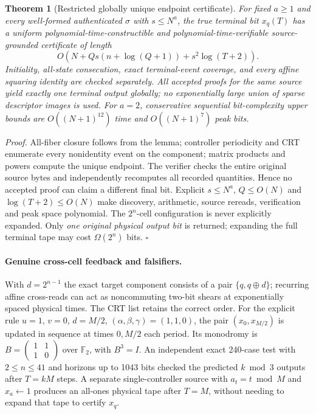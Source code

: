 \documentclass[11pt]{article}
\newtheorem{theorem}{Theorem}
\begin{document}
\begin{theorem}[Restricted globally unique endpoint certificate]
For fixed $a\ge1$ and every well-formed authenticated $\sigma$
with $s\le N^a$, the true terminal bit $x_q(T)$ has a
uniform polynomial-time-constructible and polynomial-time-verifiable
source-grounded certificate of length
\[
O\!\left(N+Qs(n+\log(Q+1))+s^2\log(T+2)\right).
\]
Initiality, all-state consecution, exact terminal-event coverage,
and every affine squaring identity are checked separately.
All accepted proofs for the same source yield \emph{exactly one}
terminal output globally; no exponentially large union of sparse
descriptor images is used. For $a=2$, conservative sequential
bit-complexity upper bounds are $O((N+1)^{12})$ time and
$O((N+1)^7)$ peak bits.
\end{theorem}
\noindent\emph{Proof.} All-fiber closure follows from the lemma;
controller periodicity and CRT enumerate every nonidentity event
on the component; matrix products and powers compute the unique
endpoint. The verifier checks the entire original source bytes
and independently recomputes all recorded quantities. Hence no
accepted proof can claim a different final bit. Explicit $s\le N^a$,
$Q\le O(N)$ and $\log(T+2)\le O(N)$ make discovery, arithmetic,
source rereads, verification and peak space polynomial.
The $2^n$-cell configuration is never explicitly expanded.
Only \emph{one original physical output bit} is returned;
expanding the full terminal tape may cost $\Omega(2^n)$ bits.
\(\square\)

\paragraph{Genuine cross-cell feedback and falsifiers.}
With $d=2^{n-1}$ the exact target component consists of a pair
$\{q,q\oplus d\}$; recurring affine cross-reads can act as
noncommuting two-bit shears at exponentially spaced physical
times. The CRT list retains the correct order.
For the explicit rule $u=1$, $v=0$, $d=M/2$, $(\alpha,\beta,\gamma)=(1,1,0)$,
the pair $(x_0,x_{M/2})$ is updated in sequence at times $0,M/2$
each period. Its monodromy is
$B=\left(\begin{smallmatrix}1&1\\1&0\end{smallmatrix}\right)$
over $\mathbb F_2$, with $B^3=I$.
An independent exact 240-case test with $2\le n\le41$ and horizons
up to 1043 bits checked the predicted $k\bmod3$ outputs after
$T=kM$ steps. A separate
single-controller source with $a_t=t\bmod M$ and
$x_a\leftarrow1$ produces an all-ones physical tape
after $T=M$, without needing to expand that tape to certify $x_q$.
\end{document}
